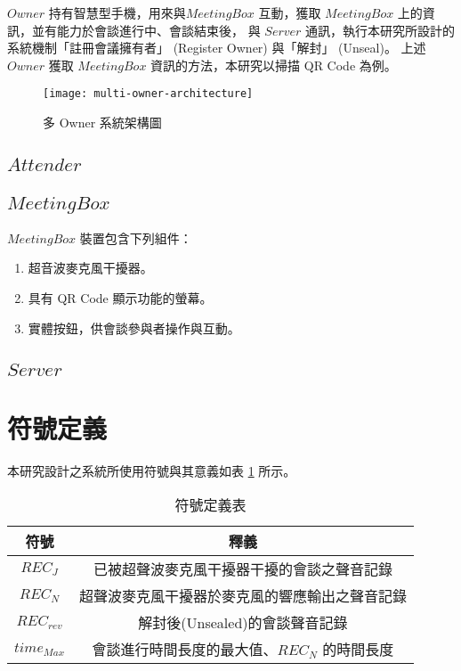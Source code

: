     $Owner$ 持有智慧型手機，用來與$MeetingBox$ 互動，獲取 $MeetingBox$ 上的資訊，並有能力於會談進行中、會談結束後，
與 $Server$ 通訊，執行本研究所設計的系統機制「註冊會議擁有者」 (Register Owner) 與「解封」 (Unseal)。
上述 $Owner$ 獲取 $MeetingBox$ 資訊的方法，本研究以掃描 QR Code 為例。

\begin{figure}[H]
    \centering
    \texttt{[image: multi-owner-architecture]}
    \caption{多 Owner 系統架構圖}
    \label{fig.m-o-arch}
\end{figure}


\subsection{$Attender$}
\subsection{$MeetingBox$}

    {$MeetingBox$} 裝置包含下列組件：
    \begin{enumerate}
        \item 超音波麥克風干擾器。
        \item 具有 QR Code 顯示功能的螢幕。
        \item 實體按鈕，供會談參與者操作與互動。
    \end{enumerate}

\subsection{$Server$}


\section{符號定義}

    本研究設計之系統所使用符號與其意義如表 \ref{table:tab.symbol} 所示。

\begin{table}[H]
    \centering
    \caption{符號定義表}
    \label{table:tab.symbol}
    \begin{tabular}{ c c }
        \hline
        \bf{符號} & \bf{釋義} \\
        \hline
        $REC_{J}$ & 已被超聲波麥克風干擾器干擾的會談之聲音記錄 \\
        $REC_{N}$ & 超聲波麥克風干擾器於麥克風的響應輸出之聲音記錄 \\
        $REC_{rev}$ & 解封後(Unsealed)的會談聲音記錄 \\
        $time_{Max}$ & 會談進行時間長度的最大值、$REC_{N}$ 的時間長度 \\
    \end{tabular}
\end{table}

